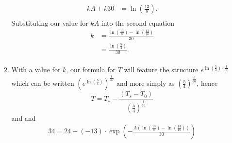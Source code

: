 \documentclass[10pt]{article}
\begin{document}
\begin{enumerate}
\begin{enumerate}
\begin{align*}
                    kA+k30 &= \ln\left(\tfrac{13}{8}\right). \\
                \end{align*}
                Substituting our value for $kA$ into the second equation
                \begin{align*}
                    k &= \frac{\ln\left(\tfrac{13}{8}\right) - \ln\left(\tfrac{13}{10}\right)}{30} \\
                     &= \frac{\ln\left(\tfrac{5}{4}\right)}{30}. \\
                \end{align*}
            \item With a value for $k$, our formula for $T$ will feature the structure
                $e^{\ln\left(\tfrac{5}{4}\right)\cdot\frac{t}{30}}$
                which can be written  $\left( e^{ \ln \left( \tfrac{5}{4} \right) } \right)^{\frac{t}{30}}$
                and more simply as $\left(\tfrac{5}{4}\right)^\frac{t}{30}$, hence
                $$T = T_s - \frac{(T_s - T_0)}{\left(\tfrac{5}{4}\right)^\frac{t}{30}}$$ and
                and
                \begin{align*}
                    34 = 24 - (-13)\cdot\exp{\left(-\frac{A\left(\ln\left(\tfrac{13}{8}\right) - \ln\left(\tfrac{13}{10}\right)\right)}{30}\right)}
                \end{align*}
        \end{enumerate}
    \end{enumerate}
\end{document}
